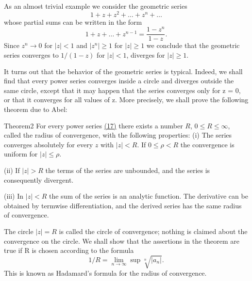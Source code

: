 As an almost trivial example we consider the geometric series
\begin{equation*}
1 + z + z ^ {2} + \dots + z ^ {n} + \dots
\end{equation*}
whose partial sums can be written in the form
\begin{equation*}
1 + z + \dots + z ^ {n - 1} = \frac {1 - z ^ {n}}{1 - z}.
\end{equation*}
Since $z^n \to 0$ for $|z| < 1$ and $|z^n| \geq 1$ for $|z| \geq 1$ we conclude that the geometric series converges to $1 / (1 - z)$ for $|z| < 1$, diverges for $|z| \geq 1$.

It turns out that the behavior of the geometric series is typical. Indeed, we shall find that every power series converges inside a circle and diverges outside the same circle, except that it may happen that the series converges only for z = 0, or that it converges for all values of z. More precisely, we shall prove the following theorem due to Abel:

\begin{originalstatement}{Theorem}{2}\label{thm:2.2}
For every power series \hyperref[eq:2.17]{(17)} there exists a number $R$, $0 \leq R \leq \infty$, called the radius of convergence, with the following properties:
(i) The series converges absolutely for every $z$ with $|z| < R$. If $0 \leq \rho < R$ the convergence is uniform for $|z| \leq \rho$.

(ii) If $|z| > R$ the terms of the series are unbounded, and the series is consequently divergent.

(iii) In $|z| < R$ the sum of the series is an analytic function. The derivative can be obtained by termwise differentiation, and the derived series has the same radius of convergence.
\end{originalstatement}

The circle $|z| = R$ is called the circle of convergence; nothing is claimed about the convergence on the circle. We shall show that the assertions in the theorem are true if R is chosen according to the formula
\begin{equation*}
1 / R = \lim _ {n \rightarrow \infty} \sup \sqrt [ n ]{| a _ {n} |}.\tag{18}\label{eq:2.18}
\end{equation*}
This is known as Hadamard's formula for the radius of convergence.

